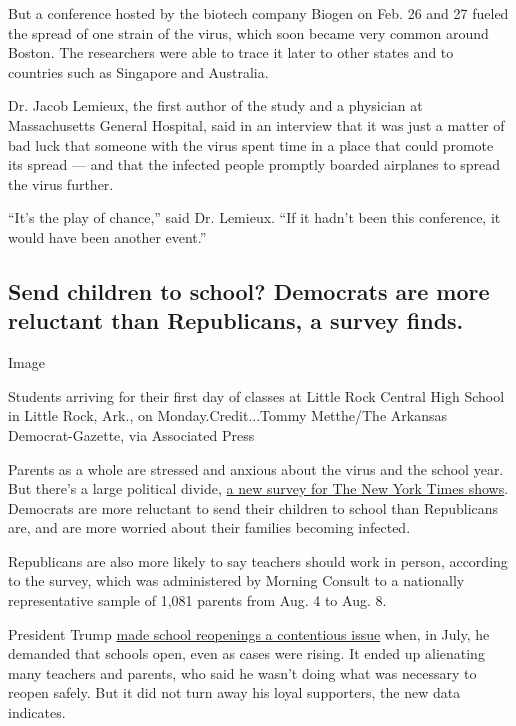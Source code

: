 But a conference hosted by the biotech company Biogen on Feb. 26 and 27
fueled the spread of one strain of the virus, which soon became very
common around Boston. The researchers were able to trace it later to
other states and to countries such as Singapore and Australia.

Dr. Jacob Lemieux, the first author of the study and a physician at
Massachusetts General Hospital, said in an interview that it was just a
matter of bad luck that someone with the virus spent time in a place
that could promote its spread --- and that the infected people promptly
boarded airplanes to spread the virus further.

``It's the play of chance,'' said Dr. Lemieux. ``If it hadn't been this
conference, it would have been another event.''

\hypertarget{send-children-to-school-democrats-are-more-reluctant-than-republicans-a-survey-finds}{%
\subsection{Send children to school? Democrats are more reluctant than
Republicans, a survey
finds.}\label{send-children-to-school-democrats-are-more-reluctant-than-republicans-a-survey-finds}}

Image

Students arriving for their first day of classes at Little Rock Central
High School in Little Rock, Ark., on Monday.Credit...Tommy Metthe/The
Arkansas Democrat-Gazette, via Associated Press

Parents as a whole are stressed and anxious about the virus and the
school year. But there's a large political divide,
\href{https://int.graylady3jvrrxbe.onion/data/documenttools/data-nyt-survey-with-morning-consult/6868859b7322727d/full.pdf}{a
new survey for The New York Times shows}. Democrats are more reluctant
to send their children to school than Republicans are, and are more
worried about their families becoming infected.

Republicans are also more likely to say teachers should work in person,
according to the survey, which was administered by Morning Consult to a
nationally representative sample of 1,081 parents from Aug. 4 to Aug. 8.

President Trump
\href{https://www.nytimes3xbfgragh.onion/2020/08/13/us/trump-schools-reopen.html}{made
school reopenings a contentious issue} when, in July, he demanded that
schools open, even as cases were rising. It ended up alienating many
teachers and parents, who said he wasn't doing what was necessary to
reopen safely. But it did not turn away his loyal supporters, the new
data indicates.

